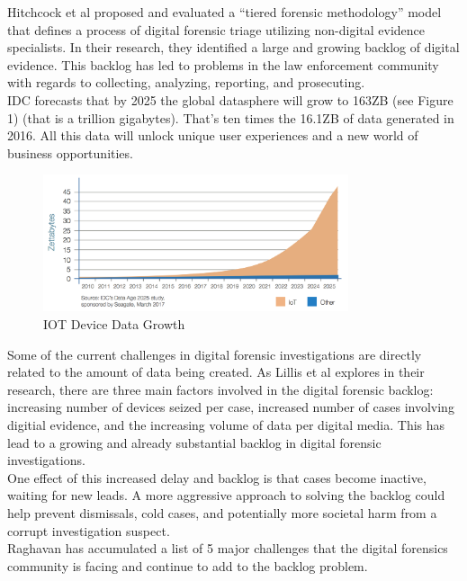\documentclass[12pt]{article}
\begin{document}
Hitchcock et al\cite{hitchcock2016tiered} proposed and evaluated a ``tiered forensic methodology'' model that defines
a process of digital forensic triage utilizing non-digital evidence specialists.  In their research, they identified
a large and growing backlog of digital evidence.  This backlog has led to problems in the law enforcement community
with regards to collecting, analyzing, reporting, and prosecuting.\\

IDC forecasts that by 2025 the global datasphere will grow to 163ZB (see Figure 1) (that is a trillion gigabytes).
That's ten times the 16.1ZB of data generated in 2016. All this data will unlock unique user experiences and
a new world of business opportunities.\\

\begin{figure}[ht]
  \centering
    \includegraphics[width=0.8\textwidth]{images/IOT_chart.jpg}
  \caption{IOT Device Data Growth}
\end{figure}

Some of the current challenges in digital forensic investigations are directly related to the amount of data being
created.  As Lillis et al\cite{lillis2016current} explores in their research, there are three main factors
involved in the digital forensic backlog: increasing number of devices seized per case, increased number of cases
involving digitial evidence, and the increasing volume of data per digital media.  This has lead to a growing
and already substantial backlog in digital forensic investigations.\\

One effect of this increased delay and backlog is that cases become inactive, waiting for new leads.  A more
aggressive approach to solving the backlog could help prevent dismissals, cold cases, and potentially more
societal harm from a corrupt investigation suspect.\\

Raghavan\cite{raghavan2013digital} has accumulated a list of 5 major challenges that the digital forensics 
community is facing and continue to add to the backlog problem.\\
\end{document}
